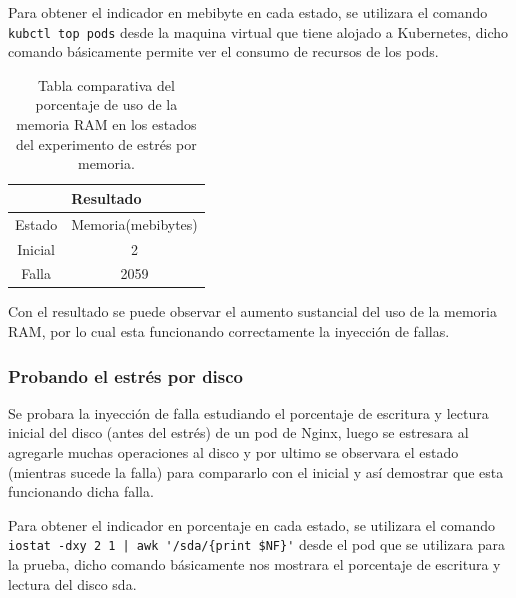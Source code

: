 \par Para obtener el indicador en mebibyte en cada estado, se utilizara el comando \\ \verb|kubctl top pods| desde la maquina virtual que tiene alojado a Kubernetes, dicho comando básicamente permite ver el consumo de recursos de los pods.\\
\begin{table}[ht!]
\begin{center}
\begin{tabular}{ |c|c| } 
 \hline
 \multicolumn{2}{|c|}{Resultado} \\
 \hline
 \hline
 Estado & Memoria(mebibytes)\\
 \hline
 Inicial & 2\\
 Falla & 2059\\
 \hline
\end{tabular}
\end{center}
\caption{Tabla comparativa del porcentaje de uso de la memoria RAM en los estados del experimento de estrés por memoria.}
\label{tab:tabla43}
\end{table}

\vspace{\baselineskip}
\par Con el resultado se puede observar el aumento sustancial del uso de la memoria RAM, por lo cual esta funcionando correctamente la inyección de fallas.\\

\subsubsection{Probando el estrés por disco}


\par Se probara la inyección de falla estudiando el porcentaje de escritura y lectura inicial del disco (antes del estrés) de un pod de Nginx, luego se estresara al agregarle muchas operaciones al disco y por ultimo se observara el estado (mientras sucede la falla) para compararlo con el inicial y así demostrar que esta funcionando dicha falla.\\

\par Para obtener el indicador en porcentaje en cada estado, se utilizara el comando \\ \verb+iostat -dxy 2 1 | awk '/sda/{print $NF}'+ desde el pod que se utilizara para la prueba, dicho comando básicamente nos mostrara el porcentaje de escritura y lectura del disco sda.\\

